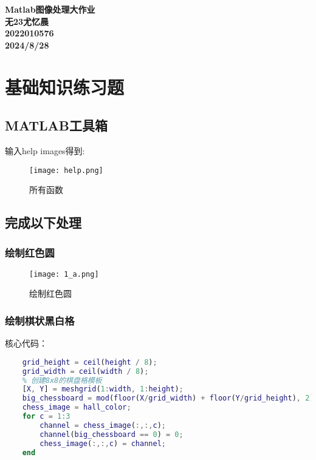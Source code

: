 \documentclass[12pt]{article}
\begin{document}
\begin{titlepage}
    \centering
    \vspace*{\fill}
    \bfseries\Huge
    Matlab图像处理大作业\\[1cm]
    \Large
    无23尤忆晨\\[0.5cm]
    2022010576\\[0.5cm]
    2024/8/28
    \vspace*{\fill}
\end{titlepage}

\tableofcontents
\newpage

\section{基础知识练习题}

\subsection{MATLAB工具箱}
输入help images得到:
\begin{figure}[H]
    \centering
    \texttt{[image: help.png]}
    \caption{所有函数}
\end{figure}

\subsection{完成以下处理}

\subsubsection{绘制红色圆}

\begin{figure}[H]
    \centering
    \texttt{[image: 1\_a.png]}
    \caption{绘制红色圆}
\end{figure}

\subsubsection{绘制棋状黑白格}

核心代码：
\begin{lstlisting}[language=matlab]
    % 计算每个棋盘格的大小
    grid_height = ceil(height / 8);
    grid_width = ceil(width / 8);
    % 创建8x8的棋盘格模板
    [X, Y] = meshgrid(1:width, 1:height);
    big_chessboard = mod(floor(X/grid_width) + floor(Y/grid_height), 2);
    chess_image = hall_color;
    for c = 1:3
        channel = chess_image(:,:,c);
        channel(big_chessboard == 0) = 0;
        chess_image(:,:,c) = channel;
    end
\end{lstlisting}
\end{document}
